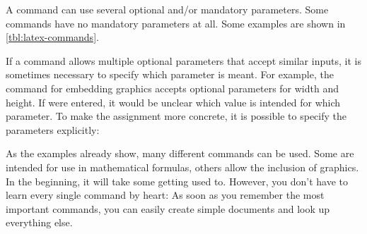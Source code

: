 A command can use several optional and/or mandatory parameters. 
Some commands have no mandatory parameters at all. 
Some examples are shown in \cref{tbl:latex-commands}.

\begin{table}[h!]
	\caption{Examples for \LaTeX-commands}
	\label{tbl:latex-commands}
\end{table}

If a command allows multiple optional parameters that accept similar inputs, it is sometimes necessary to specify which parameter is meant. 
For example, the command for embedding graphics accepts optional parameters for width and height. 
If \mono{[12cm, 4cm]} were entered, it would be unclear which value is intended for which parameter. 
To make the assignment more concrete, it is possible to specify the parameters 
explicitly:

As the examples already show, many different commands can be used. 
Some are intended for use in mathematical formulas, others allow the inclusion of graphics. 
In the beginning, it will take some getting used to. 
However, you don’t have to learn every single command by heart: As soon as you remember the most important commands, you can easily create simple documents and look up everything else.


